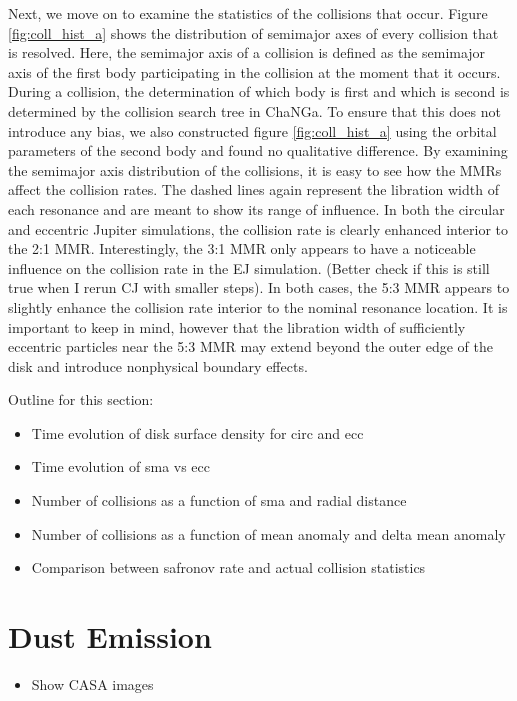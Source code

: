 \documentclass[twocolumn]{aastex63}
\begin{document}
Next, we move on to examine the statistics of the collisions that occur. Figure \ref{fig:coll_hist_a} shows the distribution of semimajor axes of every collision that is resolved. Here, the semimajor axis of a collision is defined as the semimajor axis of the first body participating in the collision at the moment that it occurs. During a collision, the determination of which body is first and which is second is determined by the collision search tree in {\sc ChaNGa}. To ensure that this does not introduce any bias, we also constructed figure \ref{fig:coll_hist_a} using the orbital parameters of the second body and found no qualitative difference. By examining the semimajor axis distribution of the collisions, it is easy to see how the MMRs affect the collision rates. The dashed lines again represent the libration width of each resonance and are meant to show its range of influence. In both the circular and eccentric Jupiter simulations, the collision rate is clearly enhanced interior to the 2:1 MMR. Interestingly, the 3:1 MMR only appears to have a noticeable influence on the collision rate in the EJ simulation. (Better check if this is still true when I rerun CJ with smaller steps). In both cases, the 5:3 MMR appears to slightly enhance the collision rate interior to the nominal resonance location. It is important to keep in mind, however that the libration width of sufficiently eccentric particles near the 5:3 MMR may extend beyond the outer edge of the disk and introduce nonphysical boundary effects.

Outline for this section:
\begin{itemize}
\item Time evolution of disk surface density for circ and ecc
\item Time evolution of sma vs ecc
\item Number of collisions as a function of sma and radial distance
\item Number of collisions as a function of mean anomaly and delta mean anomaly
\item Comparison between safronov rate and actual collision statistics
\end{itemize}

\section{Dust Emission} \label{sec:dust}

\begin{itemize}
\item Show CASA images
\end{itemize}
\end{document}
